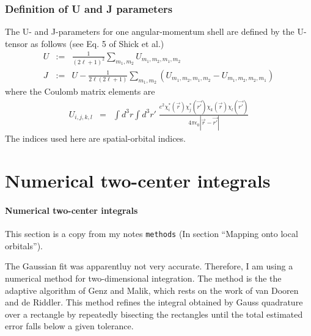 \documentclass[11pt,a4paper]{report}
\begin{document}
\subsection{Definition of U and J parameters}
The U- and J-parameters for one angular-momentum shell are defined by
the U-tensor as follows\cite{shick99_prb60_10763} (see Eq. 5 of Shick
et al.)
\begin{eqnarray}
U&:=&\frac{1}{(2\ell+1)^2}\sum_{m_1,m_2} U_{m_1,m_2,m_1,m_2}
\label{eq:ldaplusudefu}
\\
J&:=&U-\frac{1}{2\ell(2\ell+1)}\sum_{m_1,m_2}\left( U_{m_1,m_2,m_1,m_2}
-U_{m_1,m_2,m_2,m_1}\right)
\label{eq:ldaplusudefj}
\end{eqnarray}
where the Coulomb matrix elements are
\begin{eqnarray}
U_{i,j,k,l}&=&\int d^3r\int d^3r'\;
\frac{e^2\chi^*_i(\vec{r})\chi^*_j(\vec{r'})\chi_k(\vec{r})\chi_l(\vec{r'})}
{4\pi\epsilon_0|\vec{r}-\vec{r'}|}
\label{eq:defcoulombmatrixelement}
\end{eqnarray}
The indices used here are spatial-orbital indices.



\chapter{Numerical two-center integrals}
\subsubsection{Numerical two-center integrals}
This section is a copy from my notes \verb|methods| (In section ``Mapping
onto local orbitals'').

The Gaussian fit was apparentluy not very accurate. Therefore, I am
using a numerical method for two-dimensional integration.  The method
is the the adaptive algorithm of Genz and
Malik\cite{genz80_jcomputapplmath6_295}, which rests on the work of
van Dooren and de Riddler\cite{vandooren76_jcomputapplmath2_207}. This
method refines the integral obtained by Gauss quadrature over a
rectangle by repeatedly bisecting the rectangles until the total
estimated error falls below a given tolerance.
\end{document}

